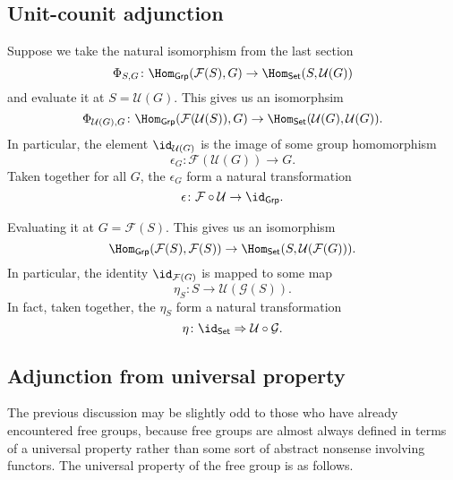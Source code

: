 \documentclass[notes.tex]{subfiles}
\begin{document}
\subsection{Unit-counit adjunction}
\label{ssc:unit_counit_adjunction}

Suppose we take the natural isomorphism from the last section
\begin{equation*}
  \Phi_{S, G}\colon \Hom_{\mathsf{Grp}}(\mathcal{F}(S), G) \to \Hom_{\mathsf{Set}}(S, \mathcal{U}(G))
\end{equation*}
and evaluate it at $S = \mathcal{U}(G)$. This gives us an isomorphsim
\begin{equation*}
  \Phi_{\mathcal{U}(G), G}\colon \Hom_{\mathsf{Grp}}(\mathcal{F}(\mathcal{U}(S)), G) \to \Hom_{\mathsf{Set}}(\mathcal{U}(G), \mathcal{U}(G)).
\end{equation*}
In particular, the element $\id_{\mathcal{U}(G)}$ is the image of some group homomorphism
\begin{equation*}
  \epsilon_{G}\colon \mathcal{F}(\mathcal{U}(G)) \to G.
\end{equation*}
Taken together for all $G$, the $\epsilon_{G}$ form a natural transformation
\begin{equation*}
  \epsilon\colon \mathcal{F} \circ \mathcal{U} \to \id_{\mathsf{Grp}}.
\end{equation*}

Evaluating it at $G = \mathcal{F}(S)$. This gives us an isomorphism
\begin{equation*}
  \Hom_{\mathsf{Grp}}(\mathcal{F}(S), \mathcal{F}(S)) \to \Hom_{\mathsf{Set}}(S, \mathcal{U}(\mathcal{F}(G))).
\end{equation*}
In particular, the identity $\id_{\mathcal{F}(G)}$ is mapped to some map
\begin{equation*}
  \eta_{S}\colon S \to \mathcal{U}(\mathcal{G}(S)).
\end{equation*}
In fact, taken together, the $\eta_{S}$ form a natural transformation
\begin{equation*}
  \eta\colon \id_{\mathsf{Set}} \Rightarrow \mathcal{U} \circ \mathcal{G}.
\end{equation*}

\subsection{Adjunction from universal property}
\label{ssc:adjunction_from_universal_property}

The previous discussion may be slightly odd to those who have already encountered free groups, because free groups are almost always defined in terms of a universal property rather than some sort of abstract nonsense involving functors. The universal property of the free group is as follows.
\end{document}
